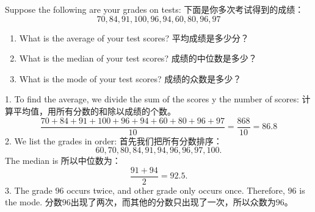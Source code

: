 \begin{example}
Suppose the following are your grades on tests: 下面是你多次考试得到的成绩：
$$
70, 84, 91, 100, 96, 94, 60, 80, 96, 97
$$
\begin{enumerate}
\item What is the average of your test scores? 平均成绩是多少分？
\item What is the median of your test scores? 成绩的中位数是多少？
\item What is the mode of your test scores? 成绩的众数是多少？
\end{enumerate}
\end{example}
\begin{solution}
1. To find the average, we divide the sum of the scores y the number of scores: 计算平均值，用所有分数的和除以成绩的个数。
$$
\dfrac{70+84+91+100+96+94+60+80+96+97}{10} = \dfrac{868}{10} = 86.8
$$
2. We list the grades in order: 首先我们把所有分数排序：
$$
60, 70, 80, 84, 91, 94, 96, 96, 97, 100.
$$
The median is  所以中位数为：
$$\dfrac{91+94}{2} = 92.5.$$
3. The grade $96$ occurs twice, and other grade only occurs once. Therefore, $96$ is the mode. 分数$96$出现了两次，而其他的分数只出现了一次，所以众数为$96$。
\end{solution}
\newpage
